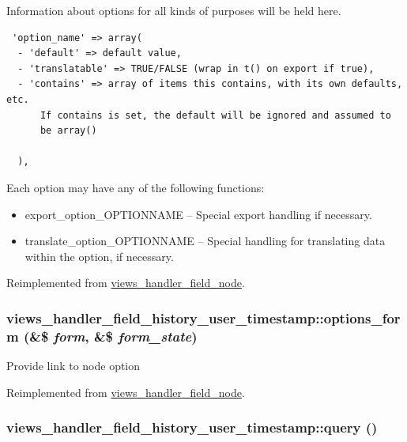 Information about options for all kinds of purposes will be held here. 

\begin{Code}\begin{verbatim} 'option_name' => array(
  - 'default' => default value,
  - 'translatable' => TRUE/FALSE (wrap in t() on export if true),
  - 'contains' => array of items this contains, with its own defaults, etc.
      If contains is set, the default will be ignored and assumed to
      be array()

  ),
\end{verbatim}
\end{Code}

 Each option may have any of the following functions:\begin{itemize}
\item export\_\-option\_\-OPTIONNAME -- Special export handling if necessary.\item translate\_\-option\_\-OPTIONNAME -- Special handling for translating data within the option, if necessary. \end{itemize}


Reimplemented from \hyperlink{classviews__handler__field__node_c2daf04495ea792ad0dd60c864f3a77e}{views\_\-handler\_\-field\_\-node}.\hypertarget{classviews__handler__field__history__user__timestamp_785f6784b015c681b25f58573b1e6859}{
\subsubsection[{options\_\-form}]{\setlength{\rightskip}{0pt plus 5cm}views\_\-handler\_\-field\_\-history\_\-user\_\-timestamp::options\_\-form (\&\$ {\em form}, \/  \&\$ {\em form\_\-state})}}
\label{classviews__handler__field__history__user__timestamp_785f6784b015c681b25f58573b1e6859}


Provide link to node option 

Reimplemented from \hyperlink{classviews__handler__field__node_f3d8a04be282a20079ea4fb82e768910}{views\_\-handler\_\-field\_\-node}.\hypertarget{classviews__handler__field__history__user__timestamp_bd6ff7a6d51f75781cf6ea6288612c07}{
\subsubsection[{query}]{\setlength{\rightskip}{0pt plus 5cm}views\_\-handler\_\-field\_\-history\_\-user\_\-timestamp::query ()}}
\label{classviews__handler__field__history__user__timestamp_bd6ff7a6d51f75781cf6ea6288612c07}


